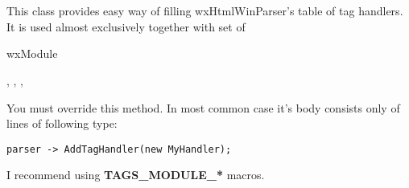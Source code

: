 %
%


\section{}\label{wxhtmltagsmodule}

This class provides easy way of filling wxHtmlWinParser's table of
tag handlers. It is used almost exclusively together with set of


wxModule


,
,
,




\label{wxhtmltagsmodulefillhandlerstable}


You must override this method. In most common case it's body consists
only of lines of following type:

\begin{verbatim}
parser -> AddTagHandler(new MyHandler);
\end{verbatim}

I recommend using {\bf TAGS\_MODULE\_*} macros.



